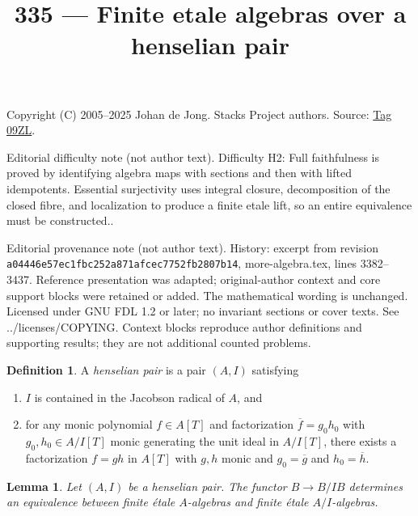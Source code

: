 \documentclass{amsart}
\theoremstyle{plain}
\newtheorem{lemma}[subsection]{Lemma}
\theoremstyle{definition}
\newtheorem{definition}[subsection]{Definition}
\theoremstyle{remark}
\numberwithin{equation}{subsection}
\begin{document}
\title[Stacks Project, Tag 09ZL]{335 --- Finite etale algebras over a henselian pair}
\maketitle
\noindent Copyright (C) 2005--2025 Johan de Jong. Stacks Project authors. Source: \href{https://stacks.math.columbia.edu/tag/09ZL}{Tag 09ZL}.

\noindent Editorial difficulty note (not author text). Difficulty H2: Full faithfulness is proved by identifying algebra maps with sections and then with lifted idempotents. Essential surjectivity uses integral closure, decomposition of the closed fibre, and localization to produce a finite etale lift, so an entire equivalence must be constructed..

\noindent Editorial provenance note (not author text). History: excerpt from revision \texttt{a0444\allowbreak 6e57e\allowbreak c1fbc\allowbreak 252a8\allowbreak 71afc\allowbreak ec775\allowbreak 2fb28\allowbreak 07b14}, more-algebra.tex, lines 3382--3437. Reference presentation was adapted; original-author context and core support blocks were retained or added. The mathematical wording is unchanged. Licensed under GNU FDL 1.2 or later; no invariant sections or cover texts. See ../licenses/COPYING. Context blocks reproduce author definitions and supporting results; they are not additional counted problems.

\begin{definition}
\label{definition-henselian-pair}
A {\it henselian pair} is a pair $(A, I)$ satisfying
\begin{enumerate}
\item $I$ is contained in the Jacobson radical of $A$, and
\item for any monic polynomial $f \in A[T]$ and factorization
$\overline{f} = g_0h_0$ with $g_0, h_0 \in A/I[T]$ monic
generating the unit ideal in $A/I[T]$, there
exists a factorization $f = gh$ in $A[T]$ with $g, h$ monic
and $g_0 = \overline{g}$ and $h_0 = \overline{h}$.
\end{enumerate}
\end{definition}

\begin{lemma}
\label{lemma-finite-etale-equivalence}
Let $(A, I)$ be a henselian pair. The functor $B \to B/IB$ determines
an equivalence between finite \'etale $A$-algebras and finite \'etale
$A/I$-algebras.
\end{lemma}
\end{document}
